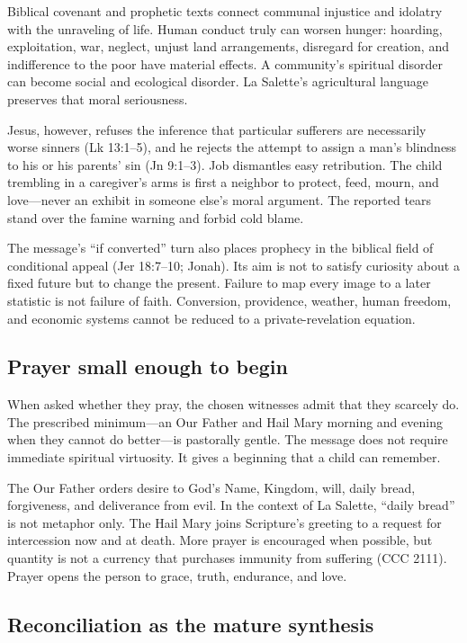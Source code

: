 Biblical covenant and prophetic texts connect communal injustice and idolatry with the unraveling of life. Human conduct truly can worsen hunger: hoarding, exploitation, war, neglect, unjust land arrangements, disregard for creation, and indifference to the poor have material effects. A community's spiritual disorder can become social and ecological disorder. La Salette's agricultural language preserves that moral seriousness.

Jesus, however, refuses the inference that particular sufferers are necessarily worse sinners (Lk 13:1--5), and he rejects the attempt to assign a man's blindness to his or his parents' sin (Jn 9:1--3). Job dismantles easy retribution. The child trembling in a caregiver's arms is first a neighbor to protect, feed, mourn, and love---never an exhibit in someone else's moral argument. The reported tears stand over the famine warning and forbid cold blame.

The message's ``if converted'' turn also places prophecy in the biblical field of conditional appeal (Jer 18:7--10; Jonah). Its aim is not to satisfy curiosity about a fixed future but to change the present. Failure to map every image to a later statistic is not failure of faith. Conversion, providence, weather, human freedom, and economic systems cannot be reduced to a private-revelation equation.

\subsection{Prayer small enough to begin}

When asked whether they pray, the chosen witnesses admit that they scarcely do. The prescribed minimum---an Our Father and Hail Mary morning and evening when they cannot do better---is pastorally gentle. The message does not require immediate spiritual virtuosity. It gives a beginning that a child can remember.

The Our Father orders desire to God's Name, Kingdom, will, daily bread, forgiveness, and deliverance from evil. In the context of La Salette, ``daily bread'' is not metaphor only. The Hail Mary joins Scripture's greeting to a request for intercession now and at death. More prayer is encouraged when possible, but quantity is not a currency that purchases immunity from suffering (CCC 2111). Prayer opens the person to grace, truth, endurance, and love.

\subsection{Reconciliation as the mature synthesis}

